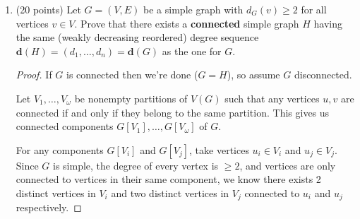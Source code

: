 \documentclass[11pt]{article}
\newcommand{\n}{\vspace{0.5cm}}
\begin{document}
\begin{enumerate}
\begin{enumerate}
\begin{proof}
          Therefore, by the principle of induction, for any \(n\) divisible by 4, we can conclude there exists a self-complementary graph with \(n\) vertices.
        \end{proof} \n
        

      \item (10 points) Prove that for any \(n \equiv 1 \pmod 4\), there exists a self-complementary graph having \(n\) vertices. \\
        (Hint: Figure out how to add one more vertex to your construction from part (b).)
        \begin{proof}
          The same process outlined above actually applies directly to the \(n \equiv 1 \pmod 4\) case as well, with the only difference being the base case.  The base case for this being \(n=1\), and since a simple graph with one vertex can't have any edges, neither can it's complement, meaning the only possible 1-vertex simple graph is self complementary.

          With the inductive step being exactly the same, we can conclude that for any \(n \equiv 1 \pmod 1\), there exists a self-complementary graph with \(n\) edges.
        \end{proof}
        
    \end{enumerate}

    \item (20 points) Let \(G = (V,E)\) be a simple graph with \(d_G(v) \geq 2\) for all vertices \(v \in V\).  Prove that there exists a \textbf{connected} simple graph \(H\) having the same (weakly decreasing reordered) degree sequence \(\textbf{d}(H) = (d_1, \hdots, d_n) = \textbf{d}(G)\) as the one for \(G\).
      \begin{proof}
        If \(G\) is connected then we're done (\(G = H\)), so assume \(G\) disconnected.

        Let \(V_1, \hdots, V_{\omega}\) be nonempty partitions of \(V(G)\) such that any vertices \(u,v\) are connected if and only if they belong to the same partition.  This gives us connected components \(G[V_1], \hdots, G[V_{\omega}]\) of \(G\).

        For any components \(G[V_i]\) and \(G[V_j]\), take vertices \(u_i \in V_i\) and \(u_j \in V_j\).  Since \(G\) is simple, the degree of every vertex is \(\geq 2\), and vertices are only connected to vertices in their same component, we know there exists 2 distinct vertices in \(V_i\) and two distinct vertices in \(V_j\) connected to \(u_i\) and \(u_j\) respectively.


\end{proof}
\end{enumerate}
\end{document}
